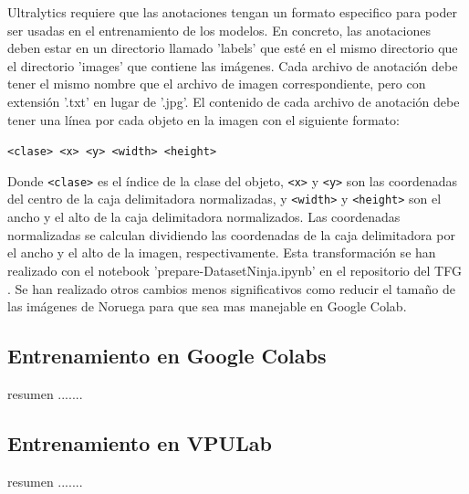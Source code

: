 Ultralytics requiere que las anotaciones tengan un formato especifico para poder ser usadas en el entrenamiento de los modelos. En concreto, las anotaciones deben estar en un directorio llamado 'labels' que esté en el mismo directorio que el directorio 'images' que contiene las imágenes. Cada archivo de anotación debe tener el mismo nombre que el archivo de imagen correspondiente, pero con extensión '.txt' en lugar de '.jpg'. El contenido de cada archivo de anotación debe tener una línea por cada objeto en la imagen con el siguiente formato:
\begin{center}
    \texttt{<clase> <x> <y> <width> <height>}
\end{center}
Donde \texttt{<clase>} es el índice de la clase del objeto, \texttt{<x>} y \texttt{<y>} son las coordenadas del centro de la caja delimitadora normalizadas, y \texttt{<width>} y \texttt{<height>} son el ancho y el alto de la caja delimitadora normalizados. Las coordenadas normalizadas se calculan dividiendo las coordenadas de la caja delimitadora por el ancho y el alto de la imagen, respectivamente. Esta transformación se han realizado con el notebook 'prepare-DatasetNinja.ipynb' en el repositorio del TFG \cite{TFG_Repository}. Se han realizado otros cambios menos significativos como reducir el tamaño de las imágenes de Noruega para que sea mas manejable en Google Colab.

\subsection{Entrenamiento en Google Colabs}
resumen .......

\subsection{Entrenamiento en VPULab}
resumen .......